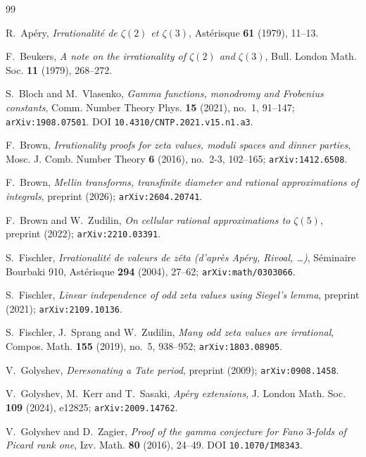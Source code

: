 \documentclass[11pt,reqno]{amsart}
\theoremstyle{plain}
\theoremstyle{definition}
\theoremstyle{remark}
\begin{document}
\begin{thebibliography}{99}

R.~Ap\'ery, \emph{Irrationalit\'e de $\zeta(2)$ et $\zeta(3)$},
Ast\'erisque \textbf{61} (1979), 11--13.

F.~Beukers, \emph{A note on the irrationality of $\zeta(2)$ and $\zeta(3)$},
Bull. London Math. Soc. \textbf{11} (1979), 268--272.

S.~Bloch and M.~Vlasenko, \emph{Gamma functions, monodromy and Frobenius constants},
Comm. Number Theory Phys. \textbf{15} (2021), no.~1, 91--147;
\texttt{arXiv:1908.07501}. DOI \texttt{10.4310/CNTP.2021.v15.n1.a3}.

F.~Brown, \emph{Irrationality proofs for zeta values, moduli spaces and dinner parties},
Mosc. J. Comb. Number Theory \textbf{6} (2016), no.~2-3, 102--165;
\texttt{arXiv:1412.6508}.

F.~Brown, \emph{Mellin transforms, transfinite diameter and rational approximations of
integrals}, preprint (2026); \texttt{arXiv:2604.20741}.

F.~Brown and W.~Zudilin, \emph{On cellular rational approximations to $\zeta(5)$},
preprint (2022); \texttt{arXiv:2210.03391}.

S.~Fischler, \emph{Irrationalit\'e de valeurs de z\^eta (d'apr\`es Ap\'ery, Rivoal, \dots)},
S\'eminaire Bourbaki 910, Ast\'erisque \textbf{294} (2004), 27--62;
\texttt{arXiv:math/0303066}.

S.~Fischler, \emph{Linear independence of odd zeta values using Siegel's lemma},
preprint (2021); \texttt{arXiv:2109.10136}.

S.~Fischler, J.~Sprang and W.~Zudilin, \emph{Many odd zeta values are irrational},
Compos. Math. \textbf{155} (2019), no.~5, 938--952; \texttt{arXiv:1803.08905}.

V.~Golyshev, \emph{Deresonating a Tate period}, preprint (2009);
\texttt{arXiv:0908.1458}.

V.~Golyshev, M.~Kerr and T.~Sasaki, \emph{Ap\'ery extensions},
J. London Math. Soc. \textbf{109} (2024), e12825; \texttt{arXiv:2009.14762}.

V.~Golyshev and D.~Zagier, \emph{Proof of the gamma conjecture for Fano $3$-folds of Picard
rank one}, Izv. Math. \textbf{80} (2016), 24--49. DOI \texttt{10.1070/IM8343}.


\end{thebibliography}
\end{document}
